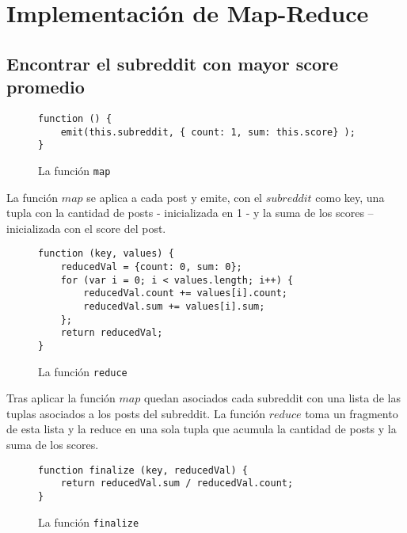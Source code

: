 \documentclass[11pt, a4paper, twoside]{article}
\begin{document}
\clearpage{\pagestyle{empty}}

\newpage


\clearpage{%
  \pagestyle{empty}\tableofcontents%
  \vspace{3cm}%
  \clearpage%
}
\setcounter{page}{1}

\section{Implementación de Map-Reduce}

\subsection{Encontrar el subreddit con mayor score promedio}


\begin{figure}[H]
  \caption{La función \texttt{map}}
  \centering
\begin{verbatim}
function () {
    emit(this.subreddit, { count: 1, sum: this.score} );
}
\end{verbatim}

\end{figure}

La función $map$ se aplica a cada post y emite, con el $subreddit$ como key, una tupla con la cantidad de posts - inicializada en 1 - y la suma de los scores -- inicializada con el score del post.

\begin{figure}[H]
\caption{La función \texttt{reduce}}
\centering
\begin{verbatim}
function (key, values) {
    reducedVal = {count: 0, sum: 0};
    for (var i = 0; i < values.length; i++) {
        reducedVal.count += values[i].count;
        reducedVal.sum += values[i].sum;
    };
    return reducedVal;
}
\end{verbatim}
\end{figure}

Tras aplicar la función $map$ quedan asociados cada subreddit con una lista de las tuplas asociados a los posts del subreddit. La función $reduce$ toma un fragmento de esta lista y la reduce en una sola tupla que acumula la cantidad de posts y la suma de los scores.


\begin{figure}[H]
\caption{La función \texttt{finalize}}
\centering
\begin{verbatim}
function finalize (key, reducedVal) {
    return reducedVal.sum / reducedVal.count;
}
\end{verbatim}
\end{figure}
\end{document}
